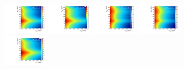 \begin{figure}[htbp]
  \centering
  \includegraphics[width=0.2\textwidth]{fig/2Dfit/template_res_mu_HP_nobb_LDy.pdf}
  \includegraphics[width=0.2\textwidth]{fig/2Dfit/template_res_e_HP_nobb_LDy.pdf}
  \includegraphics[width=0.2\textwidth]{fig/2Dfit/template_res_mu_LP_nobb_LDy.pdf}
  \includegraphics[width=0.2\textwidth]{fig/2Dfit/template_res_e_LP_nobb_LDy.pdf}\\
  \includegraphics[width=0.2\textwidth]{fig/2Dfit/template_res_mu_HP_nobb_HDy.pdf}

\end{figure}
